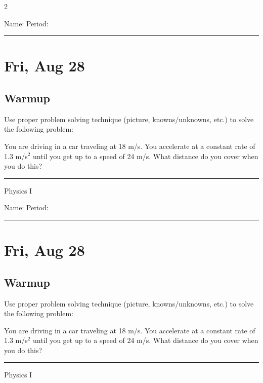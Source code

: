 \documentclass[10pt,landscape]{exam}
\def\todayDate{Fri, Aug 28}
\def\content{
Use proper problem solving technique (picture, knowns/unknowns, etc.) to solve the following problem:

\vspace{1em}

\noindent
You are driving in a car traveling at 18 m/s.  You accelerate at a constant rate of 1.3 m/s$^2$ until you get up to a speed of 24 m/s.  What distance do you cover when you do this?
}
\begin{document}
\pagestyle{empty}

\setlength{\columnsep}{0.8in}
\begin{multicols*}{2}

\noindent  
Name: \hfill Period: \hspace{5em}
\vspace{0.5em}
\hrule

\section*{\todayDate}
\subsection*{Warmup}

\content

\vfill
\hrule
\vspace{0.5em}
\hfill {\sc Physics I}

\columnbreak

\noindent  
Name: \hfill Period: \hspace{5em}
\vspace{0.5em}
\hrule

\section*{\todayDate}
\subsection*{Warmup}

\content

\vfill
\hrule
\vspace{0.5em}
\hfill {\sc Physics I}

\end{multicols*}
\end{document}
